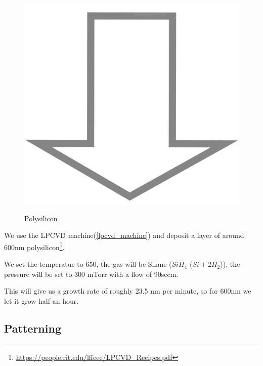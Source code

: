 \begin{figure}[H]
	\centering
	\begin{tikzpicture}[node distance = 3cm, auto, thick,scale=\CrossSectionOnly, every node/.style={transform shape}]
		
	\end{tikzpicture} \\
	\includegraphics[scale=0.01]{down_arrow.png} \\
	\begin{tikzpicture}[node distance = 3cm, auto, thick,scale=\CrossSectionOnly, every node/.style={transform shape}]
		
	\end{tikzpicture}
	\caption{Polysilicon}
\end{figure}

We use the LPCVD machine(\autoref{lpcvd_machine}) and deposit a layer of around 600nm polysilicon\footnote{\url{https://people.rit.edu/lffeee/LPCVD_Recipes.pdf}}.

We set the temperatue to 650\degreesC, the gas will be Silane ($Si H_4$ ($Si + 2H_2$)), the pressure will be set to 300 mTorr with a flow of 90sccm.

This will give us a growth rate of roughly 23.5 nm per minute, so for 600nm we let it grow half an hour.

\subsection{Patterning}

